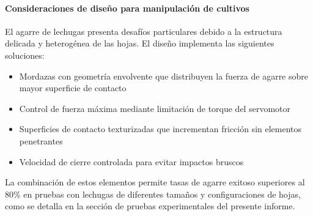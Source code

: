\paragraph{Consideraciones de diseño para manipulación de cultivos}

El agarre de lechugas presenta desafíos particulares debido a la estructura delicada y heterogénea de las hojas. El diseño implementa las siguientes soluciones:

\begin{itemize}
    \item Mordazas con geometría envolvente que distribuyen la fuerza de agarre sobre mayor superficie de contacto
    \item Control de fuerza máxima mediante limitación de torque del servomotor
    \item Superficies de contacto texturizadas que incrementan fricción sin elementos penetrantes
    \item Velocidad de cierre controlada para evitar impactos bruscos
\end{itemize}

La combinación de estos elementos permite tasas de agarre exitoso superiores al 80\% en pruebas con lechugas de diferentes tamaños y configuraciones de hojas, como se detalla en la sección de pruebas experimentales del presente informe.
